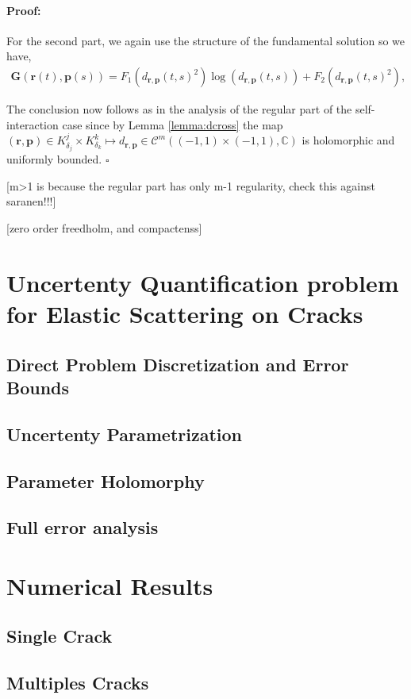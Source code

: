 \documentclass{article}
\newenvironment{proof}{\paragraph{Proof:}}{\hfill$\square$}
\newcommand{\todo}[1]{{\color{red}[#1]}}
\newcommand{\IC}{{\mathbb C}}
\newcommand{\bp}{{\bm p}}
\newcommand{\cmspace}[3]{\mathcal{C}^{#1} \left( #2, #3 \right)}
\newcommand{\br}{\bm{r}}
\newcommand{\iinterv}{(-1,1)\times(-1,1)}
\begin{document}
\begin{proof}
For the second part, we again use the structure of the fundamental solution so we have,
\begin{align*}
\mathbf{G}(\br(t),\bp(s)) = F_1(d_{\br,\bp}(t,s)^2) \log(d_{\br,\bp}(t,s)) + F_2(d_{\br,\bp}(t,s)^2),
\end{align*}

 The conclusion now follows as in the analysis of the regular part of the self-interaction case since by Lemma \ref{lemma:dcross} the map $(\br,\bp) \in K^j_{\delta_j} \times K^k_{\delta_k}\mapsto d_{\br,\bp} \in \cmspace{m}{\iinterv}{\IC}$ is holomorphic and uniformly bounded. 
\end{proof} 

\todo{m>1 is because the regular part has only m-1 regularity, check this against saranen!!!}

\todo{zero order freedholm, and compactenss}

\section{Uncertenty Quantification problem for Elastic Scattering on Cracks}
\subsection{Direct Problem Discretization and Error Bounds}
\subsection{Uncertenty Parametrization}
\subsection{Parameter Holomorphy}
\subsection{Full error analysis}

\section{Numerical Results}
\subsection{Single Crack}
\subsection{Multiples Cracks}
\end{document}
